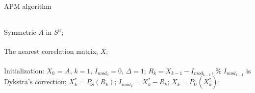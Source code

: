 \documentclass{article}
\begin{document}
\begin{algorithm}
\caption{APM algorithm}
\label{alg_APM}
\begin{algorithmic}
\renewcommand{\algorithmicrequire}{\textbf{Input:}}
\renewcommand{\algorithmicensure}{\textbf{Output:}}
\REQUIRE ~~\\ %

Symmetric $A$ in $S^n$; \\
\ENSURE ~~\\ %

The nearest correlation matrix, $X$; \\


\renewcommand{\algorithmicrequire}{\textbf{Begin}}
\renewcommand{\algorithmicensure}{\textbf{End}}
\REQUIRE ~~\\ %




\STATE Initialization: $X_0$ = $A$, $k = 1$, $I_{mod_0} = 0$, $\Delta = 1$;
\STATE $R_k = X_{k-1} - I_{mod_{k-1}}$, \% $I_{mod_{k-1}}$ is Dykstra's correction;
\STATE $X_{k}^{*} = P_S(R_k)$;
\STATE $I_{mod_k} = X_{k}^{*} - R_k$;
\STATE $X_k = P_U(X_{k}^{*})$;
\ENDWHILE \\
\ENSURE ~~\\ %

\end{algorithmic}
\end{algorithm}
\end{document}
